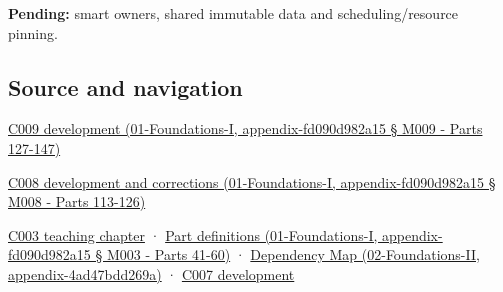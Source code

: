 \textbf{Pending:} smart owners, shared immutable data and scheduling/resource pinning.

\subsection{Source and navigation}\label{source-and-navigation}

\href{}{C009 development (01-Foundations-I, appendix-fd090d982a15 § M009 - Parts 127-147)}

\href{}{C008 development and corrections (01-Foundations-I, appendix-fd090d982a15 § M008 - Parts 113-126)}

\href{Continuous\%20Notes/Computing\%20Foundations\%20-\%20From\%20Bits\%20to\%20C++\%20and\%20Systems\%20APIs\#Where\%20the\%20bytes\%20live}{C003 teaching chapter} · \href{}{Part definitions (01-Foundations-I, appendix-fd090d982a15 § M003 - Parts 41-60)} · \href{}{Dependency Map (02-Foundations-II, appendix-4ad47bdd269a)} · \href{Continuous\%20Notes/Computing\%20Foundations\%20-\%20From\%20Bits\%20to\%20C++\%20and\%20Systems\%20APIs\#Bringing\%20the\%20object\%20model\%20back\%20to\%20bytes}{C007 development}

